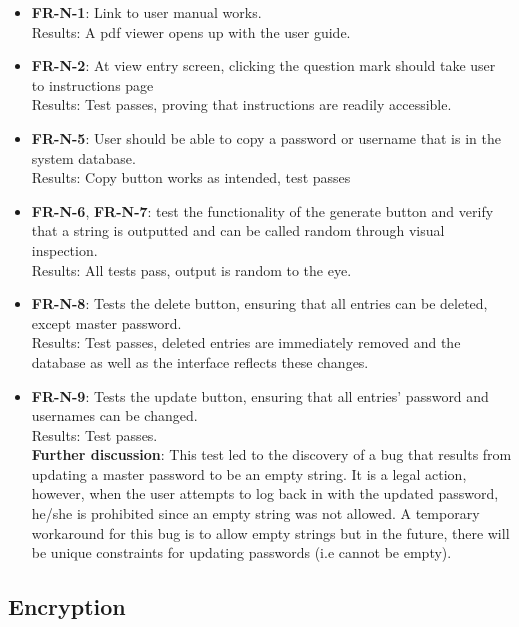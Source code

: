 \documentclass[12pt, titlepage]{article}
\begin{document}
		\begin{itemize}	

			\item \textbf{FR-N-1}: Link to user manual works.\\
			Results: A pdf viewer opens up with the user guide.
			
			\item \textbf{FR-N-2}: At view entry screen, clicking the question mark should take user to instructions page\\
			Results: Test passes, proving that  instructions are readily accessible.

			\item \textbf{FR-N-5}: User should be able to copy a password or username that is in the system database.\\
			Results: Copy button works as intended, test passes
			
			\item \textbf{FR-N-6}, \textbf{FR-N-7}: test the functionality of the generate button and verify that a string is outputted and can be called random through visual inspection.\\
			Results: All tests pass, output is random to the eye.

			\item \textbf{FR-N-8}: Tests the delete button, ensuring that all entries can be deleted, except master password.\\
			Results: Test passes, deleted entries are immediately removed and the database as well as the interface reflects these changes.

			\item \textbf{FR-N-9}: Tests the update button, ensuring that all entries’ password and usernames can be changed.\\
			Results: Test passes.\\
			\textbf{Further discussion}: This test led to the discovery of a bug that results from updating a master password to be an empty string. It is a legal action, however, when the user attempts to log back in with the updated password, he/she is prohibited since an empty string was not allowed. A temporary workaround for this bug is to allow empty strings but in the future, there will be unique constraints for updating passwords (i.e cannot be empty).

		\end{itemize}

	\subsection{Encryption}
		
\end{document}
